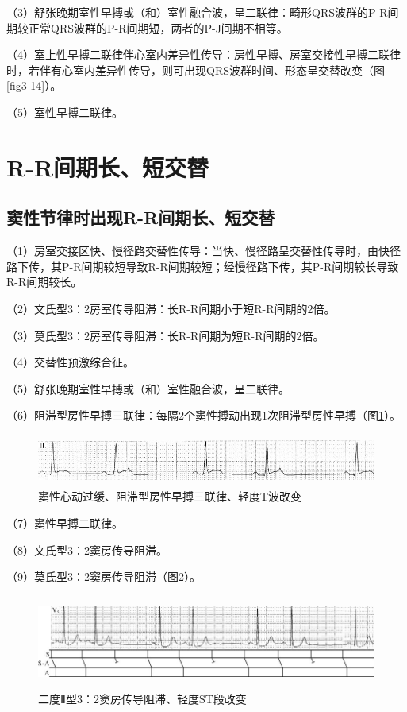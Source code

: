 （3）舒张晚期室性早搏或（和）室性融合波，呈二联律：畸形QRS波群的P-R间期较正常QRS波群的P-R间期短，两者的P-J间期不相等。

（4）室上性早搏二联律伴心室内差异性传导：房性早搏、房室交接性早搏二联律时，若伴有心室内差异性传导，则可出现QRS波群时间、形态呈交替改变（图\ref{fig3-14}）。

（5）室性早搏二联律。

\protect\hypertarget{text00009.htmlux5cux23subid63}{}{}

\section{R-R间期长、短交替}

\protect\hypertarget{text00009.htmlux5cux23subid64}{}{}

\subsection{窦性节律时出现R-R间期长、短交替}

（1）房室交接区快、慢径路交替性传导：当快、慢径路呈交替性传导时，由快径路下传，其P-R间期较短导致R-R间期较短；经慢径路下传，其P-R间期较长导致R-R间期较长。

（2）文氏型3：2房室传导阻滞：长R-R间期小于短R-R间期的2倍。

（3）莫氏型3：2房室传导阻滞：长R-R间期为短R-R间期的2倍。

（4）交替性预激综合征。

（5）舒张晚期室性早搏或（和）室性融合波，呈二联律。

（6）阻滞型房性早搏三联律：每隔2个窦性搏动出现1次阻滞型房性早搏（图\ref{fig3-22}）。

\begin{figure}[!htbp]
 \centering
 \includegraphics[width=5.58333in,height=0.66667in]{./images/Image00072.jpg}
 \captionsetup{justification=centering}
 \caption{窦性心动过缓、阻滞型房性早搏三联律、轻度T波改变}
 \label{fig3-22}
  \end{figure} 

（7）窦性早搏二联律。

（8）文氏型3：2窦房传导阻滞。

（9）莫氏型3：2窦房传导阻滞（图\ref{fig3-23}）。

\begin{figure}[!htbp]
 \centering
 \includegraphics[width=5.77083in,height=1.20833in]{./images/Image00073.jpg}
 \captionsetup{justification=centering}
 \caption{二度Ⅱ型3：2窦房传导阻滞、轻度ST段改变}
 \label{fig3-23}
  \end{figure} 


